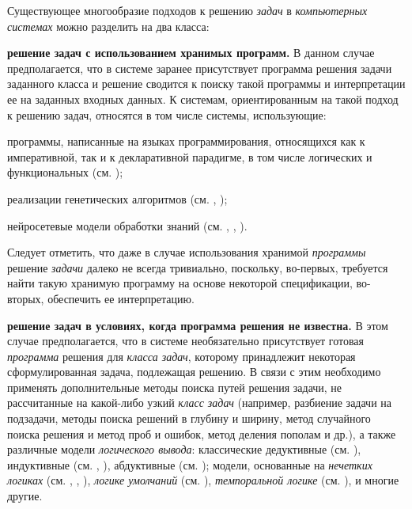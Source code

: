 Существующее многообразие подходов к решению \textit{задач} в \textit{компьютерных системах} можно разделить на два класса:
\begin{textitemize}
	\item \textbf{решение задач с использованием хранимых программ.} В данном случае предполагается, что в системе заранее присутствует программа решения задачи заданного класса и решение сводится к поиску такой программы и интерпретации ее на заданных входных данных. К системам, ориентированным на такой подход к решению задач, относятся в том числе системы, использующие:
	\begin{textitemize}
		\item программы, написанные на языках программирования, относящихся как к императивной, так и к декларативной парадигме, в том числе логических и функциональных (см. );
		\item реализации генетических алгоритмов (см. , );
		\item нейросетевые модели обработки знаний (см. , , ).
	\end{textitemize}	
	\vspace{-2\parskip}
	Следует отметить, что даже в случае использования хранимой \textit{программы} решение \textit{задачи} далеко не всегда тривиально, поскольку, во-первых, требуется найти такую хранимую программу на основе некоторой спецификации, во-вторых, обеспечить ее интерпретацию.
	\vspace{\parskip}
	\item \textbf{решение задач в условиях, когда программа решения не известна.} В этом случае предполагается, что в системе необязательно присутствует готовая \textit{программа} решения для \textit{класса задач}, которому принадлежит некоторая сформулированная задача, подлежащая решению. В связи с этим необходимо применять дополнительные методы поиска путей решения задачи, не рассчитанные на какой-либо узкий \textit{класс задач} (например, разбиение задачи на подзадачи, методы поиска решений в глубину и ширину, метод случайного поиска решения и метод проб и ошибок, метод деления пополам и др.), а также различные модели \textit{логического вывода}: классические дедуктивные (см. ), индуктивные (см. , ), абдуктивные (см. ); модели, основанные на \textit{нечетких логиках} (см. , , ), \textit{логике умолчаний} (см. ), \textit{темпоральной логике} (см. ), и многие другие.
\end{textitemize}

